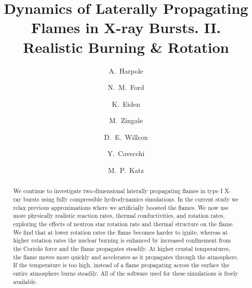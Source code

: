 \documentclass[preprint,times,tighten]{aastex63}
\begin{document}
\title{Dynamics of Laterally Propagating Flames in X-ray Bursts. II. Realistic Burning \& Rotation}


\author[0000-0002-1530-781X]{A.\ Harpole}

\author[0000-0001-8921-3624]{N.\ M.\ Ford}

\author[0000-0001-6191-4285]{K.\ Eiden}

\author[0000-0001-8401-030X]{M.\ Zingale}

\author[0000-0003-2300-5165]{D.\ E.\ Willcox}

\author[0000-0002-6447-3603]{Y.\ Cavecchi}

\author[0000-0003-0439-4556]{M.\ P.\ Katz}




\begin{abstract}
We continue to investigate two-dimensional laterally propagating flames in type I X-ray bursts using fully compressible hydrodynamics simulations.  In the current study we relax previous approximations where we artificially boosted the flames. We now use more physically realistic reaction rates, thermal conductivities, and rotation rates, exploring the effects of neutron star rotation rate and thermal structure on the flame.  We find that at lower rotation rates the flame becomes harder to ignite, whereas at higher rotation rates the nuclear burning is enhanced by increased confinement from the Coriolis force and the flame propagates steadily. At higher crustal temperatures, the flame moves more quickly and accelerates as it propagates through the atmosphere. If the temperature is too high, instead of a flame propagating across the surface the entire atmosphere burns steadily. All of the software used for these simulations is freely available.


\end{abstract}
\end{document}

